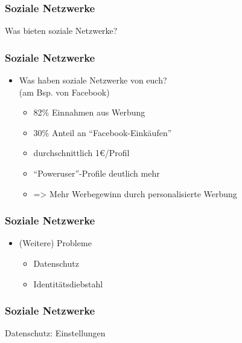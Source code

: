 \documentclass[12pt]{beamer}
\begin{document}
\begin{frame}
  \frametitle{Soziale Netzwerke}

  \begin{center} \Large
     Was bieten soziale Netzwerke?
  \end{center}
\end{frame}

\begin{frame}
  \frametitle{Soziale Netzwerke}

  \begin{itemize}
    \item Was haben soziale Netzwerke von euch?\\(am Bsp. von Facebook)
      \begin{itemize}
        \item<2-> 82\% Einnahmen aus Werbung
        \item<3-> 30\% Anteil an "`Facebook-Einkäufen"'
        \item<4-> durchschnittlich 1€/Profil
        \item<5-> "`Poweruser"'-Profile deutlich mehr
        \item<6-> => Mehr Werbegewinn durch personalisierte Werbung
      \end{itemize}
  \end{itemize}
\end{frame}

\begin{frame}
  \frametitle{Soziale Netzwerke}

  \begin{itemize}
    \item (Weitere) Probleme
      \begin{itemize}
        \item Datenschutz
        \item Identitätsdiebstahl
      \end{itemize}
  \end{itemize}
\end{frame}

\begin{frame}
  \frametitle{Soziale Netzwerke}

  \begin{center} \Large
    Datenschutz: Einstellungen 
  \end{center}
\end{frame}
\end{document}
